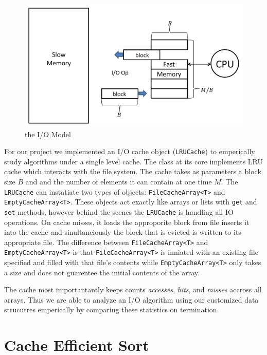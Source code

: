\documentclass[11pt]{article}
\begin{document}
\begin{figure}[H]  
\includegraphics[scale=0.5]{figures/iofsfig.pdf}
\caption{the I/O Model}
\label{theiomodel}
\end{figure}

For our project we implemented an I/O cache object (\texttt{LRUCache}) to emperically study algorithms under a single level cache.
 The class at its core implements  LRU cache which interacts with the file system.  The cache takes as parameters a block size 
$B$ and and the number of elements it can contain at one time $M$.  
The \texttt{LRUCache} can instatiate two types of objects: \texttt{FileCacheArray<T>} and 
\texttt{EmptyCacheArray<T>}.  These objects act exactly like arrays or lists with \texttt{get} and \texttt{set} methods, however 
behind the scenes the \texttt{LRUCache} is handling all IO operations.  On cache misses, it loads the approporite block from file 
inserts it into the cache and sinultaneiously the block that is evicted is written to its appropriate file.  The difference between 
\texttt{FileCacheArray<T>} and \texttt{EmptyCacheArray<T>} is that \texttt{FileCacheArray<T>} is inniated with an existing file 
specified and filled with that file's contents while \texttt{EmptyCacheArray<T>} only takes a size and does not guarentee the initial 
contents of the array.

The cache most importantantly keeps counts \textit{accesses}, \textit{hits}, and \textit{misses} accross all arrays.  Thus we are 
able to analyze an I/O algorithm using our customized data strucutres emperically by comparing these statistics on 
termination. 


\section{Cache Efficient Sort}
\end{document}

